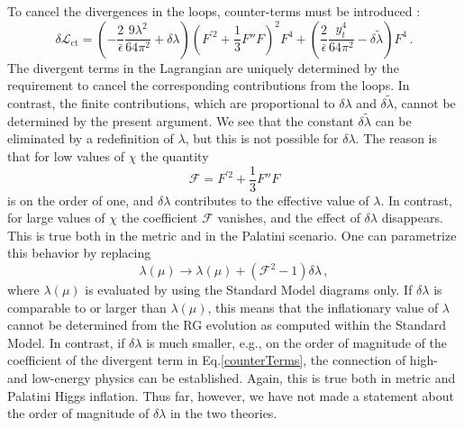 \documentclass[a4paper,11pt]{article}
\makeatletter
\newcommand*{\eg}{e.g., }
\newcommand*{\Eq}{Eq.\@\xspace}
\makeatother
\begin{document}
To cancel the divergences in the loops, counter-terms must be introduced \cite{1412.3811}:
\begin{equation} \label{counterTerms}
\delta \mathcal{L}_{\text{ct}} = \left(-\frac{2}{\bar{\epsilon}}\frac{9 \lambda^2}{64 \pi^2} + \delta \lambda\right) \left(F^{'2} + \frac{1}{3} F''F\right)^2 F^4 + \left(\frac{2}{\bar{\epsilon}}\frac{y_t^4}{64 \pi^2} - \delta\tilde{ \lambda}\right)F^4 \,.
\end{equation}
The divergent terms in the Lagrangian are uniquely determined by the requirement to cancel the corresponding contributions from the loops. In contrast, the finite contributions, which are proportional to $\delta {\lambda}$ and $\delta\tilde{\lambda}$, cannot be determined by the present argument.
We see that the constant $\delta\tilde{\lambda}$ can be eliminated by a redefinition of $\lambda$, but this is not possible for $\delta\lambda$. The reason is that for low values of $\chi$ the quantity
\begin{equation}
\mathcal{F}=F^{'2} + \dfrac{1}{3} F''F
\end{equation}
is on the order of one, and $\delta \lambda$ contributes to the effective value of $\lambda$. In contrast, for large values of $\chi$ the coefficient $\mathcal{F}$ vanishes, and the effect of $\delta \lambda$ disappears. This is true both in the metric and in the Palatini scenario. One can parametrize this behavior by replacing
\begin{equation} \label{lambdaReplacement}
\lambda(\mu) \rightarrow 	\lambda(\mu) + \left(\mathcal{F}^2-1\right) \delta \lambda\,,
\end{equation}
where $\lambda(\mu)$ is evaluated by using the Standard Model diagrams only. If $\delta \lambda$ is comparable to or larger than $\lambda(\mu)$, this means that the inflationary value of $\lambda$ cannot be determined from the RG evolution as computed within the Standard Model. In contrast, if $\delta \lambda$ is much smaller, \eg on the order of magnitude of the coefficient of the divergent term in \Eq \eqref{counterTerms}, the connection of high- and low-energy physics can be established. Again, this is true both in metric and Palatini Higgs inflation. Thus far, however, we have not made a statement about the order of magnitude of $\delta \lambda$ in the two theories.
\end{document}
